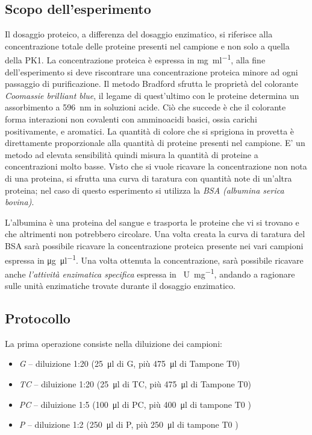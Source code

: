 \documentclass[twocolumn,a4paper,10pt]{my_report}
\begin{document}
{\subsection*{Scopo dell'esperimento}
Il dosaggio proteico, a differenza del dosaggio enzimatico, si riferisce alla concentrazione totale delle proteine presenti nel campione e non solo a quella della PK1. La concentrazione proteica è espressa in \si{\milli\gram\per\ml}, alla fine dell'esperimento si deve riscontrare una concentrazione proteica minore ad ogni passaggio di purificazione.
Il metodo Bradford sfrutta le proprietà del colorante \emph{Coomassie brilliant blue}, il legame di quest'ultimo con le proteine determina un assorbimento a \SI{596}{\nano\metre} in soluzioni acide. Ciò che succede è che il colorante forma interazioni non covalenti con amminoacidi basici, ossia carichi positivamente, e aromatici. La quantità di colore che si sprigiona in provetta è direttamente proporzionale alla quantità di proteine presenti nel campione. E' un metodo ad elevata sensibilità quindi misura la quantità di proteine a concentrazioni molto basse.
Visto che si vuole ricavare la concentrazione non nota di una proteina, si sfrutta una curva di taratura con quantità note di un'altra proteina; nel caso di questo esperimento si utilizza la \emph{BSA (albumina serica bovina)}.

L'albumina è una proteina del sangue e trasporta le proteine che vi si trovano e che altrimenti non potrebbero circolare.
Una volta creata la curva di taratura del BSA sarà possibile ricavare la concentrazione proteica presente nei vari campioni espressa in \si{\micro\gram\per\ul}.
Una volta ottenuta la concentrazione, sarà possibile ricavare anche \emph{l'attività enzimatica specifica} espressa in \si{\text U\per\milli\gram}, andando a ragionare sulle unità enzimatiche trovate durante il dosaggio enzimatico.

\subsection*{Protocollo}
La prima operazione consiste nella diluizione dei campioni:
\begin{itemize}
 \item \emph{G} -- diluizione 1:20 (\SI{25}{\ul} di G, più \SI{475}{\ul} di Tampone T0)
 \item \emph{TC} -- diluizione 1:20 (\SI{25}{\ul} di TC, più \SI{475}{\ul} di Tampone T0)
 \item \emph{PC} -- diluizione 1:5 (\SI{100}{\ul} di PC, più \SI{400}{\ul} di tampone T0 )
 \item \emph{P} -- diluizione 1:2 (\SI{250}{\ul} di P, più \SI{250}{\ul} di tampone T0 )
\end{itemize}

}
\end{document}
